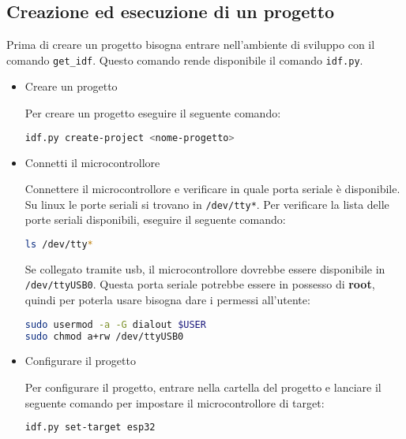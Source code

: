 \documentclass[a4paper]{article}
\begin{document}
\subsection{Creazione ed esecuzione di un progetto}
Prima di creare un progetto bisogna entrare nell'ambiente di sviluppo con il comando
\lstinline{get_idf}. Questo comando rende disponibile il comando \lstinline{idf.py}.
\begin{itemize}
  \item Creare un progetto

    \vspace{1em}
    \noindent
    Per creare un progetto eseguire il seguente comando:

\begin{lstlisting}[language=Bash]
idf.py create-project <nome-progetto>
\end{lstlisting}
    
  \item Connetti il microcontrollore

    \vspace{1em}
    \noindent
    Connettere il microcontrollore e verificare in quale porta seriale è disponibile.
    Su linux le porte seriali si trovano in \lstinline{/dev/tty*}. Per verificare la
    lista delle porte seriali disponibili, eseguire il seguente comando:

\begin{lstlisting}[language=Bash]
ls /dev/tty*
\end{lstlisting}
      
    Se collegato tramite usb, il microcontrollore dovrebbe essere disponibile in
    \lstinline{/dev/ttyUSB0}. Questa porta seriale potrebbe essere in possesso di
    \textbf{root}, quindi per poterla usare bisogna dare i permessi all'utente:

\begin{lstlisting}[language=Bash]
sudo usermod -a -G dialout $USER
sudo chmod a+rw /dev/ttyUSB0
\end{lstlisting}

  \item Configurare il progetto

    \vspace{1em}
    \noindent
    Per configurare il progetto, entrare nella cartella del progetto e lanciare il
    seguente comando per impostare il microcontrollore di target:

\begin{lstlisting}[language=Bash]
idf.py set-target esp32
\end{lstlisting}


\end{itemize}
\end{document}
